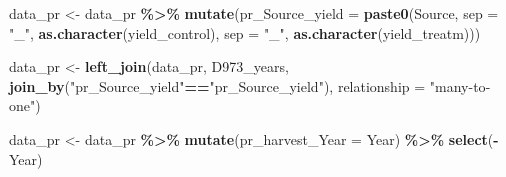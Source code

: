 \documentclass[
]{article}
\newenvironment{Shaded}{\begin{snugshade}}{\end{snugshade}}
\newcommand{\AttributeTok}[1]{\textcolor[rgb]{0.13,0.29,0.53}{#1}}
\newcommand{\FunctionTok}[1]{\textcolor[rgb]{0.13,0.29,0.53}{\textbf{#1}}}
\newcommand{\NormalTok}[1]{#1}
\newcommand{\OtherTok}[1]{\textcolor[rgb]{0.56,0.35,0.01}{#1}}
\newcommand{\SpecialCharTok}[1]{\textcolor[rgb]{0.81,0.36,0.00}{\textbf{#1}}}
\newcommand{\StringTok}[1]{\textcolor[rgb]{0.31,0.60,0.02}{#1}}
\begin{document}
\begin{Shaded}
\begin{Highlighting}[]
\NormalTok{data\_pr }\OtherTok{\textless{}{-}} 
\NormalTok{data\_pr }\SpecialCharTok{\%\textgreater{}\%} 
  \FunctionTok{mutate}\NormalTok{(}\AttributeTok{pr\_Source\_yield =} \FunctionTok{paste0}\NormalTok{(Source, }\AttributeTok{sep =} \StringTok{"\_"}\NormalTok{, }\FunctionTok{as.character}\NormalTok{(yield\_control), }\AttributeTok{sep =} \StringTok{"\_"}\NormalTok{, }\FunctionTok{as.character}\NormalTok{(yield\_treatm)))}

\NormalTok{data\_pr }\OtherTok{\textless{}{-}}   
  \FunctionTok{left\_join}\NormalTok{(data\_pr, D973\_years, }\FunctionTok{join\_by}\NormalTok{(}\StringTok{"pr\_Source\_yield"}\SpecialCharTok{==}\StringTok{"pr\_Source\_yield"}\NormalTok{), }\AttributeTok{relationship =} \StringTok{"many{-}to{-}one"}\NormalTok{) }

\NormalTok{data\_pr }\OtherTok{\textless{}{-}} 
\NormalTok{  data\_pr }\SpecialCharTok{\%\textgreater{}\%} 
  \FunctionTok{mutate}\NormalTok{(}\AttributeTok{pr\_harvest\_Year =}\NormalTok{ Year) }\SpecialCharTok{\%\textgreater{}\%} 
  \FunctionTok{select}\NormalTok{(}\SpecialCharTok{{-}}\NormalTok{Year)}
\end{Highlighting}
\end{Shaded}
\end{document}
